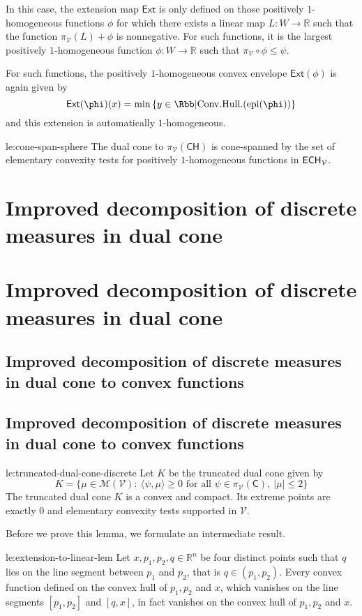 \documentclass[12pt]{amsart}
\let\Section=\section
\renewcommand{\section}[2][empty]{%
  \xdef\SubsectionName{}%
  \ifthenelse{\equal{#1}{empty}}%
               {\xdef\SectionName{#2}%
                \Section{#2}}%
               {\xdef\SectionName{#1}%
                \Section[#1]{#2}}%
}
\let\Subsection=\subsection
\renewcommand{\subsection}[2][empty]{%
  \ifthenelse{\equal{#1}{empty}}%
               {\xdef\SubsectionName{#2}%
                \Subsection{#2}}%
               {\xdef\SubsectionName{#1}%
                \Subsection[#1]{#2}}%
}
\begin{document}
In this case, the extension map $\mathsf{Ext}$ is only defined on those positively $1$-homogeneous functions $\phi$ for which there exists a linear map $L: W \to \mathbb{R}$ such that the function $\pi_{\mathcal{V}}(L) + \phi$ is nonnegative. For such functions, it is the largest positively $1$-homogeneous function $\phi: W \to \mathbb{R}$ such that $\pi_{\mathcal{V}} \circ \phi \leq \psi$. 

For such functions, the positively $1$-homogeneous convex envelope $\mathsf{Ext}(\phi)$ is again given by 
\[
\mathsf{Ext}(\phi)(x) = \min \set{ y \in \Rbb \middle| \mathrm{Conv.Hull.}(\mathrm{epi}(\phi))}
\]
and this extension is automatically $1$-homogeneous.

\begin{lemma}{le:cone-span-sphere}
	The dual cone to $\pi_{\mathcal{V}}(\mathsf{CH})$ is cone-spanned by the set of elementary convexity tests for positively $1$-homogeneous functions in $\mathsf{ECH}_{\mathcal{V}}$.	
\end{lemma}

\section{Improved decomposition of discrete measures in dual cone}

\subsection{Improved decomposition of discrete measures in dual cone to convex functions}

\begin{lemma}{le:truncated-dual-cone-discrete}
Let $K$ be the truncated dual cone given by
\[
K = \{ \mu \in \mathcal{M}(\mathcal{V}): \ \langle \psi , \mu \rangle \geq 0 \text{ for all } \psi \in \pi_{\mathcal{V}}(\mathsf{C}), \ |\mu| \leq 2 \}
\]
The truncated dual cone $K$ is a convex and compact. Its extreme points are exactly $0$ and elementary convexity tests supported in $\mathcal{V}$.
\end{lemma}

Before we prove this lemma, we formulate an intermediate result. 

\begin{lemma}{le:extension-to-linear-lem}
Let $x, p_1, p_2, q \in \mathbb{R}^n$ be four distinct points such that $q$ lies on the line segment between $p_1$ and $p_2$, that is $q \in (p_1, p_2)$. Every convex function defined on the convex hull of $p_1, p_2$ and $x$, which vanishes on the line segments $[p_1, p_2]$ and $[q,x]$, in fact vanishes on the convex hull of $p_1, p_2$ and $x$.
\end{lemma}
\end{document}
